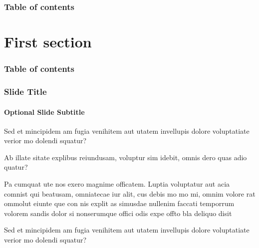 \documentclass[
	aspectratio=169, %
	t, %
	onlytextwidth, %
	10pt, %
]{beamer}
\begin{document}
\begin{frame}
    \frametitle{Table of contents}
    \tableofcontents
\end{frame}



\section{First section}

\begin{frame}
    \frametitle{Table of contents}
    \tableofcontents[currentsection]
\end{frame}

\begin{frame}
	\frametitle{Slide Title}
	\framesubtitle{Optional Slide Subtitle}
	
	\begin{adjustwidth}{0cm}{0.35\textwidth} %
		Sed et mincipidem am fugia venihitem aut utatem invellupis dolore voluptatiate verior mo dolendi squatur?

		Ab illate sitate explibus reiundusam, voluptur sim idebit, omnis dero quas adio quatur?

		Pa cumquat ute nos exero magnime officatem. Luptia voluptatur aut acia comnist qui beatusam, omniatecae iur alit, cus debis mo mo mi, omnim volore rat ommolut eiunte que con nis explit as simusdae nullenim faccati temporrum volorem sandis dolor si nonserumque offici odis expe offto bla deliquo disit
	\end{adjustwidth}
\end{frame}


\begin{frame}
	\begin{adjustwidth}{0cm}{0.15\textwidth} %
		{\Huge\textcolor{ICLBlue}{{\ImperialSansSemiBold Sed et mincipidem am fugia venihitem aut utatem invellupis dolore voluptatiate verior mo dolendi squatur?}}}
	\end{adjustwidth}
\end{frame}
\end{document}
